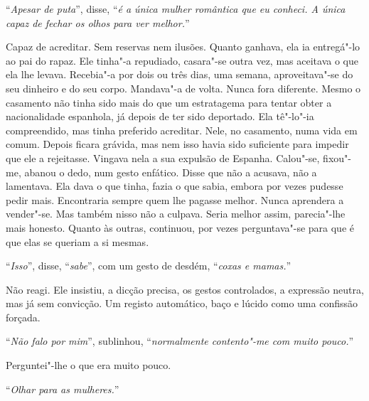 ``\emph{Apesar de puta}'',
disse,
``\emph{é a única mulher romântica que eu conheci. A única capaz de
fechar os olhos para ver melhor.}''

Capaz de acreditar. Sem reservas nem ilusões. Quanto ganhava, ela ia
entregá"-lo ao pai do rapaz. Ele tinha"-a repudiado, casara"-se outra
vez, mas aceitava o que ela lhe levava. Recebia"-a por dois ou três
dias, uma semana, aproveitava"-se do seu dinheiro e do seu corpo.
Mandava"-a de volta. Nunca fora diferente. Mesmo o casamento não tinha
sido mais do que um estratagema para tentar obter a nacionalidade
espanhola, já depois de ter sido deportado. Ela tê"-lo"-ia compreendido,
mas tinha preferido acreditar. Nele, no casamento, numa vida em comum.
Depois ficara grávida, mas nem isso havia sido suficiente para impedir
que ele a rejeitasse. Vingava nela a sua expulsão de Espanha. Calou"-se,
fixou"-me, abanou o dedo, num gesto enfático. Disse que não a acusava,
não a lamentava. Ela dava o que tinha, fazia o que sabia, embora por
vezes pudesse pedir mais. Encontraria sempre quem lhe pagasse melhor.
Nunca aprendera a vender"-se. Mas também nisso não a culpava. Seria
melhor assim, parecia"-lhe mais honesto. Quanto às outras, continuou,
por vezes perguntava"-se para que é que elas se queriam a si mesmas.

``\emph{Isso}'',
disse,
``\emph{sabe}'',
com um gesto de desdém,
``\emph{coxas e mamas.}''

Não reagi. Ele insistiu, a dicção precisa, os gestos controlados, a
expressão neutra, mas já sem convicção. Um registo automático, baço e
lúcido como uma confissão forçada.

``\emph{Não falo por mim}'',
sublinhou,
``\emph{normalmente contento"-me com muito pouco.}''

Perguntei"-lhe o que era muito pouco.

``\emph{Olhar para as mulheres.}''

